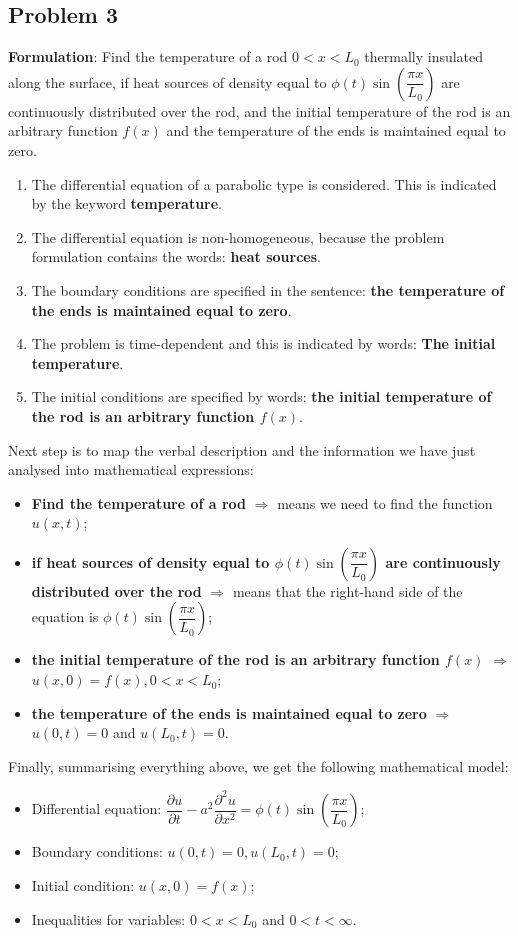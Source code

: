 \subsection{Problem 3}

{\bfseries Formulation}: Find the temperature of a rod $0<x<L_{0}$ thermally insulated along the surface, if heat sources of density equal to $\phi(t)\sin\left(\dfrac{\pi x}{L_{0}}\right)$ are continuously distributed over the rod, and the initial temperature of the rod is an arbitrary function $f(x)$ and the temperature of the ends is maintained equal to zero.
\begin{enumerate}
\item The differential equation of a parabolic type is considered. This is indicated by the keyword {\bfseries temperature}.
\item The differential equation is non-homogeneous, because the problem formulation contains the words: {\bfseries heat sources}.
\item The boundary conditions are specified in the sentence: {\bfseries the temperature of the ends is maintained equal to zero}.
\item The problem is time-dependent and this is indicated by words: {\bfseries The initial temperature}.
\item The initial conditions are specified by words: {\bfseries the initial temperature of the rod is an arbitrary function $f(x)$}.
\end{enumerate}
Next step is to map the verbal description and the information we have just analysed into mathematical expressions:
\begin{itemize}
\item {\bfseries Find the temperature of a rod} $\Longrightarrow$ means we need to find the function $u(x,t)$;
\item {\bfseries if heat sources of density equal to $\phi(t)\sin\left(\dfrac{\pi x}{L_{0}}\right)$ are continuously distributed over the rod} $\Longrightarrow$ means that the right-hand side of the equation is $\phi(t)\sin\left(\dfrac{\pi x}{L_{0}}\right)$;
\item {\bfseries the initial temperature of the rod is an arbitrary function $f(x)$} $\Longrightarrow$ $u(x,0)=f(x), 0<x<L_{0}$;
\item {\bfseries the temperature of the ends is maintained equal to zero} $\Longrightarrow$ $u(0,t)=0$ and $u(L_{0},t)=0$.
\end{itemize}
Finally, summarising everything above, we get the following mathematical model:
\begin{itemize}
\item Differential equation: $\dfrac{\partial u}{\partial t} - a^{2}\dfrac{\partial^{2} u}{\partial x^{2}}=\phi(t)\sin\left(\dfrac{\pi x}{L_{0}}\right)$;
\item Boundary conditions: $u(0,t)=0, u(L_{0},t)=0$;
\item Initial condition: $u(x,0)=f(x)$;
\item Inequalities for variables: $0<x<L_{0}$ and $0<t<\infty$.
\end{itemize}

